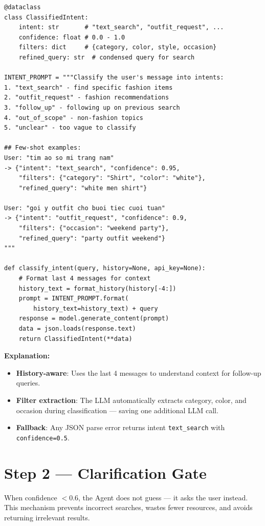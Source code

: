 \documentclass[12pt, twoside]{report}
\begin{document}
\begin{lstlisting}[caption={Intent Classification --- agent/intent\_classifier.py}]
@dataclass
class ClassifiedIntent:
    intent: str       # "text_search", "outfit_request", ...
    confidence: float # 0.0 - 1.0
    filters: dict     # {category, color, style, occasion}
    refined_query: str  # condensed query for search

INTENT_PROMPT = """Classify the user's message into intents:
1. "text_search" - find specific fashion items
2. "outfit_request" - fashion recommendations
3. "follow_up" - following up on previous search
4. "out_of_scope" - non-fashion topics
5. "unclear" - too vague to classify

## Few-shot examples:
User: "tim ao so mi trang nam"
-> {"intent": "text_search", "confidence": 0.95,
    "filters": {"category": "Shirt", "color": "white"},
    "refined_query": "white men shirt"}

User: "goi y outfit cho buoi tiec cuoi tuan"
-> {"intent": "outfit_request", "confidence": 0.9,
    "filters": {"occasion": "weekend party"},
    "refined_query": "party outfit weekend"}
"""

def classify_intent(query, history=None, api_key=None):
    # Format last 4 messages for context
    history_text = format_history(history[-4:])
    prompt = INTENT_PROMPT.format(
        history_text=history_text) + query
    response = model.generate_content(prompt)
    data = json.loads(response.text)
    return ClassifiedIntent(**data)
\end{lstlisting}

\textbf{Explanation:}
\begin{itemize}
    \item \textbf{History-aware}: Uses the last 4 messages to understand context for follow-up queries.
    \item \textbf{Filter extraction}: The LLM automatically extracts category, color, and occasion during classification --- saving one additional LLM call.
    \item \textbf{Fallback}: Any JSON parse error returns intent \texttt{text\_search} with \texttt{confidence=0.5}.
\end{itemize}

\section{Step 2 --- Clarification Gate}

\begin{tcolorbox}[title=Method: Proactive Clarification]
When confidence $< 0.6$, the Agent does not guess --- it asks the user instead. This mechanism prevents incorrect searches, wastes fewer resources, and avoids returning irrelevant results.
\end{tcolorbox}
\end{document}

